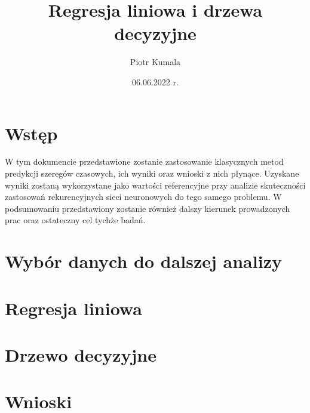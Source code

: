 \documentclass{article}
\title{Regresja liniowa i drzewa decyzyjne}
\author{Piotr Kumala}
\date{06.06.2022 r.}
\begin{document}
	
	\maketitle
	
	\section{Wstęp}
	W tym dokumencie przedstawione zostanie zastosowanie klasycznych metod predykcji szeregów czasowych, ich wyniki oraz wnioski z nich płynące. Uzyskane wyniki zostaną wykorzystane jako wartości referencyjne przy analizie skuteczności zastosowań rekurencyjnych sieci neuronowych do tego samego problemu. W podsumowaniu przedstawiony zostanie również dalszy kierunek prowadzonych prac oraz ostateczny cel tychże badań. 
	
	\section{Wybór danych do dalszej analizy}
	
	
	\section{Regresja liniowa}
	\section{Drzewo decyzyjne}
	\section{Wnioski}
	
\end{document}
